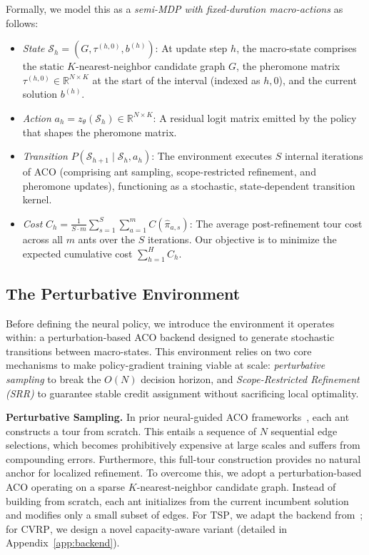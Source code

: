 \documentclass[sigconf]{acmart}
\newcommand{\TSP}{\textsc{TSP}}
\newcommand{\CVRP}{\textsc{CVRP}}
\begin{document}
Formally, we model this as a \emph{semi-MDP with fixed-duration macro-actions} as follows:
\begin{itemize}[topsep=0pt]
\item \emph{State} $\mathcal{S}_h = (G, \tau^{(h,0)}, b^{(h)})$: At update step $h$, the macro-state comprises the static $K$-nearest-neighbor candidate graph $G$, the pheromone matrix $\tau^{(h,0)} \in \mathbb{R}^{N \times K}$ at the start of the interval (indexed as $h,0$), and the current solution $b^{(h)}$.
\item \emph{Action} $a_h = z_\theta(\mathcal{S}_h) \in \mathbb{R}^{N \times K}$: A residual logit matrix emitted by the policy that shapes the pheromone matrix.
\item \emph{Transition} $P(\mathcal{S}_{h+1} \mid \mathcal{S}_h, a_h)$: The environment executes $S$ internal iterations of ACO (comprising ant sampling, scope-restricted refinement, and pheromone updates), functioning as a stochastic, state-dependent transition kernel.
\item \emph{Cost} $C_h = \frac{1}{S \cdot m} \sum_{s=1}^{S} \sum_{a=1}^{m} C(\hat{\pi}_{a,s})$: The average post-refinement tour cost across all $m$ ants over the $S$ iterations. Our objective is to minimize the expected cumulative cost $\sum_{h=1}^H C_h$.
\end{itemize}

\subsection{The Perturbative Environment}
\label{sec:backend}

Before defining the neural policy, we introduce the environment it operates within: a perturbation-based ACO backend designed to generate stochastic transitions between macro-states. This environment relies on two core mechanisms to make policy-gradient training viable at scale: \emph{perturbative sampling} to break the $O(N)$ decision horizon, and \emph{Scope-Restricted Refinement (SRR)} to guarantee stable credit assignment without sacrificing local optimality.

\smallskip\noindent\textbf{Perturbative Sampling.}
In prior neural-guided ACO frameworks~\cite{deepaco,gfacs,gtgaco}, each ant constructs a tour from scratch. This entails a sequence of $N$ sequential edge selections, which becomes prohibitively expensive at large scales and suffers from compounding errors. Furthermore, this full-tour construction provides no natural anchor for localized refinement. To overcome this, we adopt a perturbation-based ACO operating on a sparse $K$-nearest-neighbor candidate graph. Instead of building from scratch, each ant initializes from the current incumbent solution and modifies only a small subset of edges. For \TSP{}, we adapt the backend from~\cite{faco}; for \CVRP{}, we design a novel capacity-aware variant (detailed in Appendix~\ref{app:backend}).
\end{document}

